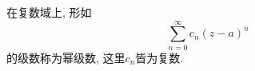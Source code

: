 在复数域上, 形如
\begin{equation}\label{anal_eq1}
\sum_{n=0}^\infty c_n(z-a)^n
\end{equation}
的级数称为幂级数, 这里$c_n$皆为复数.


